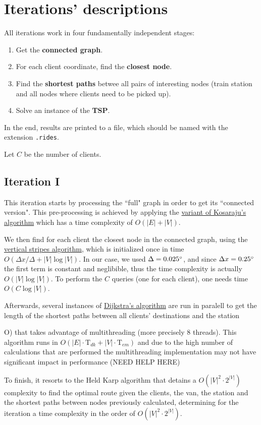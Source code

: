 \chapter{Iterations' descriptions} \label{iterations}

All iterations work in four fundamentally independent stages:
\begin{enumerate}
    \item Get the \textbf{connected graph}.
    \item For each client coordinate, find the \textbf{closest node}.
    \item Find the \textbf{shortest paths} betwee all pairs of interesting nodes (train station and all nodes where clients need to be picked up).
    \item Solve an instance of the \textbf{\acrlong*{TSP}}.
\end{enumerate}

In the end, results are printed to a file, which should be named with the extension \texttt{.rides}.\par

Let $C$ be the number of clients.

\section{Iteration I}
This iteration starts by processing the ``full" graph in order to get its ``connected version". This pre-processing is achieved by applying the \hyperref[algorithm-scc-kosaraju-v]{variant of Kosaraju's algorithm} which has a time complexity of $O(|E| + |V|)$.\par
We then find for each client the closest node in the connected graph, using the \hyperref[algorithm-vstripes]{vertical stripes algorithm}, which is initialized once in time $O(\Delta x / \Delta + |V| \log |V|)$. In our case, we used $\Delta = 0.025\degree$, and since $\Delta x = 0.25\degree$ the first term is constant and neglibible, thus the time complexity is actually $O(|V| \log |V|)$. To perform the $C$ queries (one for each client), one needs time $O(C \log |V|)$.\par
Afterwards, several instances of \hyperref[algorithm-shortestpath-dijkstra]{Dijkstra's algorithm} are run in paralell to get the length of the shortest paths between all clients' destinations and the station


O) that takes advantage of multithreading (more precisely 8 threads). This algorithm runs in $O(|E|\cdot \text{T}_{dk}+|V|\cdot \text{T}_{em})$ and due to the high number of calculations that are performed the multithreading implementation may not have significant impact in performance (NEED HELP HERE)
\par
To finish, it resorts to the Held Karp algorithm that detains a $O(|V|^2 \cdot 2^{|V|})$ complexity to find the optimal route given the clients, the van, the station and the shortest paths between nodes previously calculated, determining for the iteration a time complexity in the order of $O(|V|^2 \cdot 2^{|V|})$.

